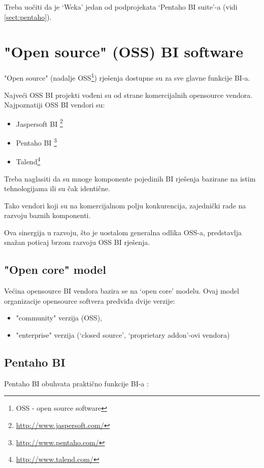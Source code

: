 \documentclass[times, utf8, seminar]{fit}
\begin{document}
Treba uočiti da je `Weka' jedan od podprojekata `Pentaho BI suite'-a (vidi \ref{sect:pentaho}).

\chapter{"Open source" (OSS) BI software}

"Open source" (nadalje OSS\footnote{OSS - open source software}) rješenja dostupne su za sve glavne funkcije BI-a.
 
Najveći OSS BI projekti vođeni su od strane komercijalnih opensource vendora. Najpoznatiji OSS BI vendori su:

\begin{itemize}
 \item Jaspersoft BI \footnote{\url{http://www.jaspersoft.com/}}
 \item Pentaho BI \footnote{\url{http://www.pentaho.com/}}
 \item Talend\footnote{\url{http://www.talend.com/}}
\end{itemize}
 
Treba naglasiti da su mnoge komponente pojedinih BI rješenja bazirane na istim tehnologijama ili su čak identične.

Tako vendori koji su na komercijalnom polju konkurencija, zajednički rade na razvoju baznih komponenti. 

Ova sinergija u razvoju, što je uostalom generalna odlika OSS-a, predstavlja snažan poticaj brzom razvoju OSS BI rješenja.

\section{"Open core" model}

Većina opensource BI vendora bazira se na `open core' modelu. Ovaj model organizacije opensource softvera predviđa dvije verzije:
\begin{itemize}
  \item "community" verzija (OSS),
  \item "enterprise" verzija (`closed source', `proprietary addon'-ovi vendora)
\end{itemize}

\section{Pentaho BI}

Pentaho BI obuhvata praktično funkcije BI-a \cite[str.~7]{pentaho32}:
\end{document}
